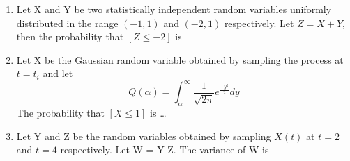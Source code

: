 \documentclass[journal,12pt,twocolumn]{IEEEtran}
\begin{document}
\begin{enumerate}
\begin{enumerate}
\end{enumerate}

\item Let X and Y be two statistically independent random variables uniformly distributed in the range $(-1,1)$ and $(-2,1)$ respectively. Let $Z = X+Y$, then the probability that $[Z\leqslant-2]$ is
\begin{enumerate}
\end{enumerate}
%
\solution

\item Let X be the Gaussian random variable obtained by sampling the process at $t=t_i$ and let 
\begin{equation*}
Q(\alpha)={\int_{\alpha}^{\infty}}\dfrac{1}{\sqrt{2\pi}}e^{\frac{-y^2}{2}}dy
\end{equation*}
%
The probability that $[\textit{X}\leqslant1]$ is \dots
%

%


\item Let Y and Z be the random variables obtained by sampling $X(t)$ at $t=2$ and $t=4$ respectively. Let W = Y-Z. The variance of W is
\begin{enumerate}
\end{enumerate}
\end{enumerate}
\end{document}
